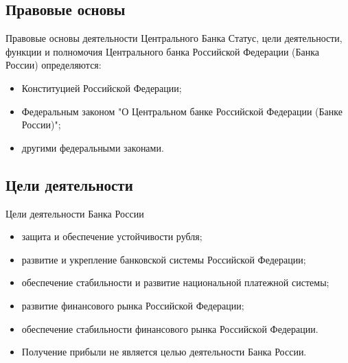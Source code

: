 \documentclass[_DKB_p1_Money.tex]{subfiles}
\begin{document}
\subsection{Правовые основы}
\begin{frame}{Правовые основы деятельности Центрального Банка}
Статус, цели деятельности, функции и полномочия Центрального банка Российской Федерации (Банка России) определяются:
\begin{itemize}
\item
Конституцией Российской Федерации;

\item
Федеральным законом "О Центральном банке Российской Федерации (Банке России)"; 

\item
другими федеральными законами.
\end{itemize}
\end{frame}

\subsection{Цели деятельности }
\begin{frame}{Цели деятельности Банка России }
\begin{itemize}[<+->]
\item
защита и обеспечение устойчивости рубля;
\item
развитие и укрепление банковской системы Российской Федерации;
\item
обеспечение стабильности и развитие национальной платежной системы;
\item
развитие финансового рынка Российской Федерации;
\item
обеспечение стабильности финансового рынка Российской Федерации.
\item
Получение прибыли не является целью деятельности Банка России.
\end{itemize}
\end{frame}
\end{document}
